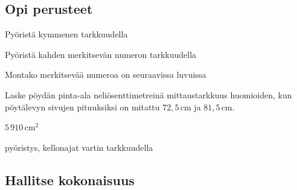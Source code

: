
\begin{tehtavasivu}

\subsection*{Opi perusteet}

\begin{tehtava}
Pyöristä kymmenen tarkkuudella
\begin{vastaus}
\end{vastaus}
\end{tehtava}

\begin{tehtava}
Pyöristä kahden merkitsevän numeron tarkkuudella
\begin{vastaus}
\end{vastaus}
\end{tehtava}

\begin{tehtava}
Montako merkitsevää numeroa on seuraavissa luvuissa
\begin{vastaus}
\end{vastaus}
\end{tehtava}

\begin{tehtava}
Laske pöydän pinta-ala neliösenttimetreinä mittaustarkkuus huomioiden, kun pöytälevyn sivujen pituuksiksi on mitattu $72,5$\,cm ja $81,5$\,cm.
\begin{vastaus}
$5\,910$\,cm$^2$
\end{vastaus}
\end{tehtava}

pyöristys, kellonajat vartin tarkkuudella
\subsection*{Hallitse kokonaisuus}


\end{tehtavasivu}
